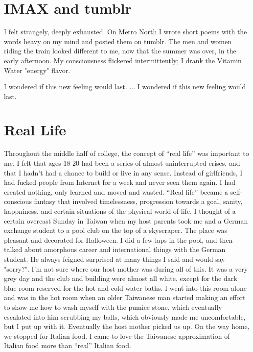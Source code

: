 \documentclass[12pt]{memoir}
\begin{document}
\chapter{IMAX and tumblr} 
I felt strangely, deeply exhausted.  On Metro North I wrote short poems with the
words heavy on my mind and posted them on tumblr.  The men and women
riding the train looked different to me, now that the summer was over, 
in the early afternoon.  My consciousness flickered intermittently; 
I drank the Vitamin Water "energy" flavor.

I wondered if this new feeling would last.
...
I wondered if this new feeling would last.

  

\chapter{Real Life} 

Throughout the middle half of college, the concept of ``real life'' was
important to me.  I felt that ages 18-20 had been a series of almost
uninterrupted crises, and that I hadn't had a chance to build or live in any
sense.  Instead of girlfriends, I had fucked people from Internet for a week and
never seen them again.  I had created nothing, only learned and moved and
wasted.  ``Real life'' became a self-conscious fantasy that involved
timelessness, progression towards a goal, sanity, happniness, and certain
situations of the physical world of life.  I thought of a certain overcast
Sunday in Taiwan when my host parents took me and a German exchange student to a
pool club on the top of a skyscraper.  The place was pleasant and decorated for
Halloween.  I did a few laps in the pool, and then talked about amorphous career
and international things with the German student.  He always feigned surprised
at many things I said and would say "sorry?".  I'm not sure where our host
mother was during all of this.  It was a very grey day and the club and building
were almost all white, except for the dark blue room reserved for the hot and
cold water baths.  I went into this room alone and was in the hot room when an
older Taiwanese man started making an effort to show me how to wash myself with
the pumice stone, which eventually escalated into him scrubbing my balls, which
obviously made me uncomfortable, but I put up with it.  Eventually the host
mother picked us up.  On the way home, we stopped for Italian food.  I came to
love the Taiwanese approximation of Italian food more than ``real'' Italian
food.
\end{document}
